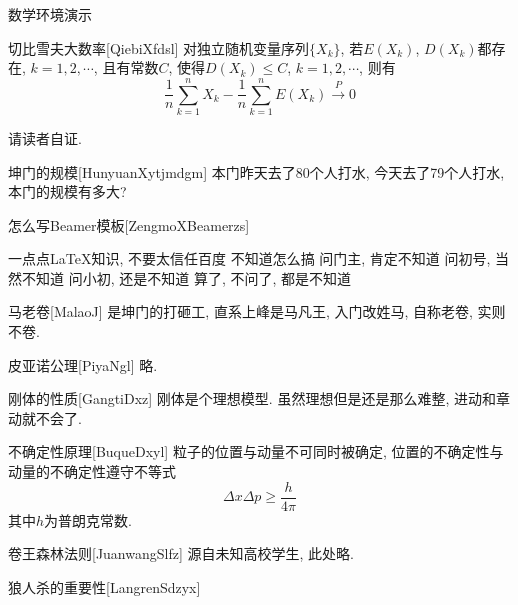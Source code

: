 \documentclass[hyperref, UTF8, CJK, aspectratio=169]{beamer}
\begin{document}
\begin{frame}{数学环境演示}
	\begin{univtheorem}{切比雪夫大数率}[QiebiXfdsl]
		对独立随机变量序列$\{X_k\}$, 若$E(X_k)$, $D(X_k)$都存在, $k=1,2,\cdots$, 且有常数$C$, 使得$D(X_k)\leq C$, $k=1,2,\cdots$, 则有
		\begin{equation}
		\dfrac{1}{n} \sum_{k=1}^{n} X_k - \dfrac{1}{n} \sum_{k=1}^{n} E(X_k) \stackrel{\;P\;}{\longrightarrow} 0
		\end{equation}
	\end{univtheorem}
	\begin{univproof}{}
		请读者自证.
	\end{univproof}
	\begin{univexample}{坤门的规模}[HunyuanXytjmdgm]
		本门昨天去了80个人打水, 今天去了79个人打水, 本门的规模有多大?
	\end{univexample}
	\begin{univalgorithm}{怎么写Beamer模板}[ZengmoXBeamerzs]
		\begin{algorithmic}[1]
		\REQUIRE 一点点\LaTeX 知识, 不要太信任百度
		\ENSURE 不知道怎么搞
		\STATE 问门主, 肯定不知道
		\STATE 问初号, 当然不知道
		\STATE 问小初, 还是不知道
		\RETURN 算了, 不问了, 都是不知道
		\end{algorithmic}
	\end{univalgorithm}
	\begin{univdefinition}{马老卷}[MalaoJ]
		是坤门的打砸工, 直系上峰是马凡王, 入门改姓马, 自称老卷, 实则不卷.
	\end{univdefinition}
	\begin{univaxiom}{皮亚诺公理}[PiyaNgl]
		略.
	\end{univaxiom}
	\begin{univproperty}{刚体的性质}[GangtiDxz]
		刚体是个理想模型. 虽然理想但是还是那么难整, 进动和章动就不会了.
	\end{univproperty}
	\begin{univproposition}{不确定性原理}[BuqueDxyl]
		粒子的位置与动量不可同时被确定, 位置的不确定性与动量的不确定性遵守不等式
		\begin{equation}
			\Delta x \Delta p \geq \dfrac{h}{4\pi}
		\end{equation}
		其中$h$为普朗克常数.
	\end{univproposition}
	\begin{univlemma}{卷王森林法则}[JuanwangSlfz]
		源自未知高校学生, 此处略.
	\end{univlemma}
	\begin{univcorollary}{狼人杀的重要性}[LangrenSdzyx]

\end{univcorollary}
\end{frame}
\end{document}
